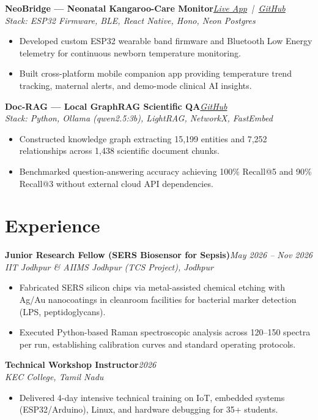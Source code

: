 \documentclass[9.2pt,a4paper]{article}
\newcommand{\role}[3]{\textbf{#1}\hfill\textit{#2}\\[-2pt]\textit{\small #3}\par}
\begin{document}
\role{NeoBridge --- Neonatal Kangaroo-Care Monitor}{\href{https://neobridge.vercel.app}{Live App} \,|\, \href{https://github.com/sukeshperiyasamy/NeoBridge}{GitHub}}{Stack: ESP32 Firmware, BLE, React Native, Hono, Neon Postgres}
\begin{itemize}
  \item Developed custom ESP32 wearable band firmware and Bluetooth Low Energy telemetry for continuous newborn temperature monitoring.
  \item Built cross-platform mobile companion app providing temperature trend tracking, maternal alerts, and demo-mode clinical AI insights.
\end{itemize}

\role{Doc-RAG --- Local GraphRAG Scientific QA}{\href{https://github.com/sukeshperiyasamy}{GitHub}}{Stack: Python, Ollama (qwen2.5:3b), LightRAG, NetworkX, FastEmbed}
\begin{itemize}
  \item Constructed knowledge graph extracting 15,199 entities and 7,252 relationships across 1,438 scientific document chunks.
  \item Benchmarked question-answering accuracy achieving 100\% Recall@5 and 90\% Recall@3 without external cloud API dependencies.
\end{itemize}

\section{Experience}
\role{Junior Research Fellow (SERS Biosensor for Sepsis)}{May 2026 -- Nov 2026}{IIT Jodhpur \& AIIMS Jodhpur (TCS Project), Jodhpur}
\begin{itemize}
  \item Fabricated SERS silicon chips via metal-assisted chemical etching with Ag/Au nanocoatings in cleanroom facilities for bacterial marker detection (LPS, peptidoglycans).
  \item Executed Python-based Raman spectroscopic analysis across 120--150 spectra per run, establishing calibration curves and standard operating protocols.
\end{itemize}

\role{Technical Workshop Instructor}{2026}{KEC College, Tamil Nadu}
\begin{itemize}
  \item Delivered 4-day intensive technical training on IoT, embedded systems (ESP32/Arduino), Linux, and hardware debugging for 35+ students.
\end{itemize}
\end{document}
